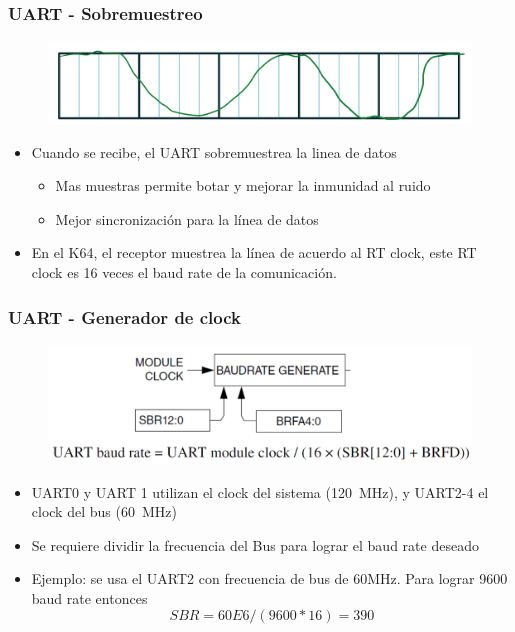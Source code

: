 \documentclass[10.5pt,scale=1.0,t,aspectratio=169,hyperref={pdfpagelabels=false}]{beamer}
\begin{document}
\begin{frame}
	\frametitle{UART - Sobremuestreo}
	
	\begin{figure}
		\centering
		\includegraphics[scale=0.3]{38_UARTOverSampling}
	\end{figure}
	
	\begin{itemize}
		\item Cuando se recibe, el UART sobremuestrea la linea de datos
		\begin{itemize}
			\item Mas muestras permite botar y mejorar la inmunidad al ruido
			\item Mejor sincronización para la línea de datos
		\end{itemize}
		\item En el K64, el receptor muestrea la línea de acuerdo al RT clock, este RT clock es 16 veces el baud rate de la comunicación. 
	\end{itemize}
\end{frame}
\begin{frame}
	\frametitle{UART - Generador de clock}
	
	\begin{figure}
		\centering
		\includegraphics[scale=0.6]{39_UARTBaudRateGenerator}
	\end{figure}
	
	\begin{itemize}
		\item UART0 y UART 1 utilizan el clock del sistema (\SI{120}{\mega\hertz}), y UART2-4 el clock del bus (\SI{60}{\mega\hertz})
		\item Se requiere dividir la frecuencia del Bus para lograr el baud rate deseado 
		\item Ejemplo: se usa el UART2 con frecuencia de bus de 60MHz. Para lograr 9600 baud rate entonces
		\[
			SBR = 60E6/(9600*16) = 390
		\]
	\end{itemize}
\end{frame}
\end{document}

